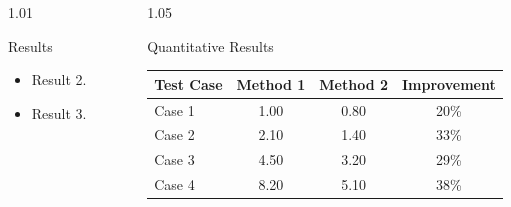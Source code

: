 \documentclass[final]{beamer}
\newlength{\sepwidth}
\newlength{\colwidth}
\newcommand{\separatorcolumn}{%
    \begin{column}{\sepwidth}
    \end{column}
}
\begin{document}
\begin{frame}[t]
\begin{columns}[t]
\begin{column}{1.01\colwidth}
\begin{block}{Results}
\begin{itemize}
    \item Result 2.

    \item Result 3.

\end{itemize}

\end{block}


\end{column}



\separatorcolumn

\begin{column}{1.05\colwidth}



\begin{block}{Quantitative Results}

\begin{table}

\centering

\begin{tabular}{|l|c|c|c|}

\hline

\rowcolor[rgb]{0.941,0.941,0.941}

\textbf{Test Case}
&
\textbf{Method 1}
&
\textbf{Method 2}
&
\textbf{Improvement}
\\

\hline

Case 1
&
1.00
&
0.80
&
20\%
\\

\hline

Case 2
&
2.10
&
1.40
&
33\%
\\

\hline

Case 3
&
4.50
&
3.20
&
29\%
\\

\hline

Case 4
&
8.20
&
5.10
&
38\%
\\

\hline

\end{tabular}

\end{table}

\end{block}



\end{column}
\end{columns}
\end{frame}
\end{document}
